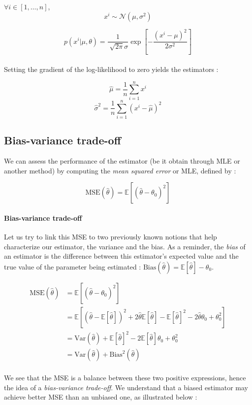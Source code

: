 \documentclass[a4paper,12pt]{article}
\begin{document}
$\forall i \in [1,\dots,n]$,
\[x^i\sim\mathcal{N}(\mu,\sigma^2)\]

\[p(x^i|\mu,\theta)=\dfrac{1}{\sqrt[]{2\pi}\sigma}\exp\left[-\frac{(x^i-\mu)^2}{2\sigma^2}\right]\]
\\

Setting the gradient of the log-likelihood to zero yields the estimators :

\[ \hat{\mu} = \frac{1}{n} \sum_{i=1}^nx^i\]
\[ \hat{\sigma}^2 = \frac{1}{n} \sum_{i=1}^n (x^i-\hat{\mu})^2\]

\subsection{Bias-variance trade-off}

We can assess the performance of the estimator (be it obtain through MLE or another method) by computing the {\em mean squared error} or MLE, defined by :

\[\mbox{MSE}(\hat{\theta}) = \mathbb{E}[(\hat{\theta}-\theta_0)^2]\]

\paragraph{Bias-variance trade-off} Let us try to link this MSE to two previously known notions that help characterize our estimator, the variance and the bias. As a reminder, the {\em bias} of an estimator is the difference between this estimator's expected value and the true value of the parameter being estimated : $\mbox{Bias}(\hat{\theta})=\mathbb{E}[\hat{\theta}]-\theta_0$.

\begin{align*}
\mbox{MSE}(\hat{\theta}) &= \mathbb{E}[(\hat{\theta}-\theta_0)^2]\\
&= \mathbb{E}\left[(\hat{\theta}-\mathbb{E}[\hat{\theta}])^2+2\hat{\theta}\mathbb{E}[\hat{\theta}]-\mathbb{E}[\hat{\theta}]^2-2\hat{\theta}\theta_0+\theta_0^2\right]\\
&=\mbox{Var}(\hat{\theta})+\mathbb{E}[\hat{\theta}]^2-2\mathbb{E}[\hat{\theta}]\theta_0+\theta_0^2\\
&=\mbox{Var}(\hat{\theta})+\mbox{Bias}^2(\hat{\theta})
\end{align*}\\
We see that the MSE is a balance between these two positive expressions, hence the idea of a {\em bias-variance trade-off}. We understand that a biased estimator may achieve better MSE than an
unbiased one, as illustrated below :
\end{document}
